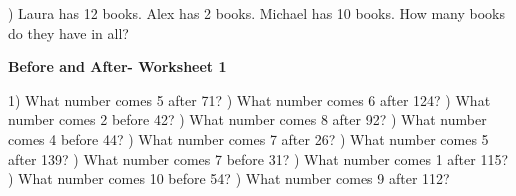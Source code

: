 \documentclass{article}%
\begin{document}
\newline%
\newline%
) Laura has 12 books. Alex has 2 books. Michael has 10 books. How many books do they have in all?%
\newline%
\newline%
\newline%
\pagebreak%
\large%
\begin{center}%
\textbf{Before and After- Worksheet 1}%
\newline%
\newline%
\newline%
\end{center} \normalsize%
1) What number comes 5 after 71?%
\newline%
\newline%
) What number comes 6 after 124?%
\newline%
\newline%
) What number comes 2 before 42?%
\newline%
\newline%
) What number comes 8 after 92?%
\newline%
\newline%
) What number comes 4 before 44?%
\newline%
\newline%
) What number comes 7 after 26?%
\newline%
\newline%
) What number comes 5 after 139?%
\newline%
\newline%
) What number comes 7 before 31?%
\newline%
\newline%
) What number comes 1 after 115?%
\newline%
\newline%
) What number comes 10 before 54?%
\newline%
\newline%
) What number comes 9 after 112?%
\end{document}

